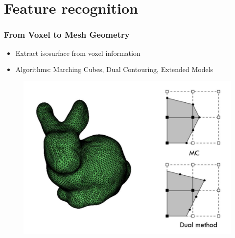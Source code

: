 \section{Feature recognition}

\begin{frame}

	\frametitle{From Voxel to Mesh Geometry}
	\begin{minipage}{0.85\textwidth}
		\begin{itemize}
		\item Extract isosurface from voxel information
		\end{itemize}

		\begin{itemize}
		\item Algorithms: Marching Cubes, Dual Contouring, Extended Models
		\end{itemize}

		\begin{figure}
		\includegraphics[scale=0.4]{Pictures/bunny_MC.pdf}

		\end{figure}


\end{minipage}
\end{frame}
